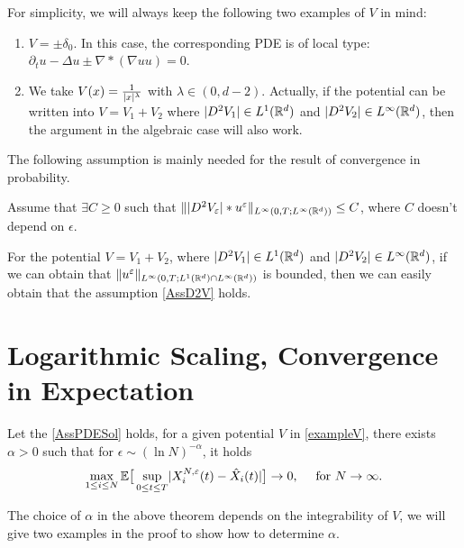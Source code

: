 For simplicity, we will always keep the following two examples of $V$ in mind:
\begin{example}\label{exampleV}
	\begin{enumerate}
		\item $V= \pm\delta_0$. In this case, the corresponding PDE is of local type: $\partial_t u - \Delta  u\pm \nabla *(\nabla u u)=0$. 
		\item We take $V(x)=\frac{1}{\lvert x\rvert^{\lambda} }$ with $\lambda\in (0,d-2)$. Actually, if the potential can be written into $V = V_1+V_2$ where $|D^2V_1|\in L^1 (\mathbb{R}^d)$ and $|D^2 V_2|\in L^\infty(\mathbb{R}^d)$, then the argument in the algebraic case will also work. 
	\end{enumerate}
\end{example}

\vskip3mm
The following assumption is mainly needed for the result of convergence in probability.
\begin{assumption}\label{AssD2V}
   Assume that $\exists C\geq 0$ such that	$\||D^2V_\varepsilon|*u^\varepsilon\|_{L^\infty(0,T; L^\infty(\mathbb{R}^d))}\leq C$, where $C$ doesn't depend on $\epsilon$.
\end{assumption}
\vskip2mm

For the potential $V = V_1+V_2$, where $|D^2V_1|\in L^1 (\mathbb{R}^d)$ and $|D^2 V_2|\in L^\infty(\mathbb{R}^d)$, if we can obtain that $\|u^\varepsilon\|_{L^\infty(0,T; L^1(\mathbb{R}^d)\cap L^\infty(\mathbb{R}^d))}$ is bounded, then we can easily obtain that the assumption \autoref{AssD2V} holds.

\section{ Logarithmic Scaling, Convergence in Expectation}

\begin{theorem}\label{thmlog}
	Let the \autoref{AssPDESol} holds, for a given potential $V$ in \autoref{exampleV}, there exists $\alpha>0$ such that for $\epsilon\sim (\ln N)^{-\alpha}$, it holds
	\begin{align*}
	\max_{1\leq i\leq N} \mathbb{E}\big[ \sup_{0\leq t\leq T}\lvert X_i^{N,\varepsilon}(t) -\hat{X}_i(t) \rvert\big]  \to 0, \quad\mbox{ for } N\to \infty.
	\end{align*}
\end{theorem}

\begin{remark}
	The choice of $\alpha$ in the above theorem depends on the integrability of $V$, we will give two examples in the proof to show how to determine $\alpha$.
\end{remark}


